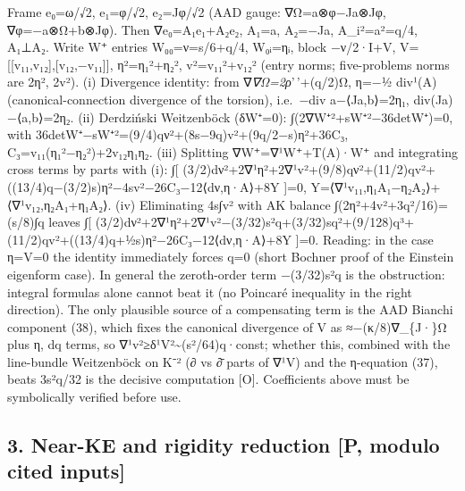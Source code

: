 \documentclass[
  10pt,
]{report}
\begin{document}
Frame e₀=ω/√2, e₁=φ/√2, e₂=Jφ/√2 (AAD gauge: ∇Ω=a⊗φ−Ja⊗Jφ,
∇φ=−a⊗Ω+b⊗Jφ). Then ∇e₀=A₁e₁+A₂e₂, A₁=a, A₂=−Ja,
\textbar A\_i\textbar²=\textbar a\textbar²=q/4, A₁⊥A₂. Write W⁺ entries
W₀₀=ν=s/6+q/4, W₀ᵢ=ηᵢ, block −ν/2·I+V,
V={[}{[}v₁₁,v₁₂{]},{[}v₁₂,−v₁₁{]}{]}, \textbar η\textbar²=η₁²+η₂²,
\textbar v\textbar²=v₁₁²+v₁₂² (entry norms; five-problems norms are
2\textbar η\textbar², 2\textbar v\textbar²). (i) Divergence identity:
from ∇\emph{∇Ω=2ρ}'\,'+(q/2)Ω, η=−½ div¹(A) (canonical-connection
divergence of the torsion), i.e.~−div a−⟨Ja,b⟩=2η₁, div(Ja)−⟨a,b⟩=2η₂.
(ii) Derdziński Weitzenböck (δW⁺=0):
∫(2\textbar∇W⁺\textbar²+s\textbar W⁺\textbar²−36detW⁺)=0, with
36detW⁺−s\textbar W⁺\textbar²=(9/4)qν²+(8\textbar s\textbar−9q)\textbar v\textbar²+(9q/2−\textbar s\textbar)\textbar η\textbar²+36C₃,
C₃=v₁₁(η₁²−η₂²)+2v₁₂η₁η₂. (iii) Splitting ∇W⁺=∇¹W⁺+T(A)·W⁺ and
integrating cross terms by parts with (i): ∫{[}
(3/2)\textbar dν\textbar²+2\textbar∇¹η\textbar²+2\textbar∇¹v\textbar²+(9/8)qν²+(11/2)q\textbar v\textbar²+((13/4)q−(3/2)\textbar s\textbar)\textbar η\textbar²−4\textbar s\textbar\textbar v\textbar²−26C₃−12⟨dν,η·A⟩+8Y
{]}=0, Y=⟨∇¹v₁₁,η₁A₁−η₂A₂⟩+⟨∇¹v₁₂,η₂A₁+η₁A₂⟩. (iv) Eliminating
4\textbar s\textbar∫\textbar v\textbar² with AK balance
∫(2\textbar η\textbar²+4\textbar v\textbar²+3q²/16)=(\textbar s\textbar/8)∫q
leaves ∫{[}
(3/2)\textbar dν\textbar²+2\textbar∇¹η\textbar²+2\textbar∇¹v\textbar²−(3/32)s²q+(3/32)\textbar s\textbar q²+(9/128)q³+(11/2)q\textbar v\textbar²+((13/4)q+½\textbar s\textbar)\textbar η\textbar²−26C₃−12⟨dν,η·A⟩+8Y
{]}=0. Reading: in the case η=V=0 the identity immediately forces q=0
(short Bochner proof of the Einstein eigenform case). In general the
zeroth-order term −(3/32)s²q is the obstruction: integral formulas alone
cannot beat it (no Poincaré inequality in the right direction). The only
plausible source of a compensating term is the AAD Bianchi component
(38), which fixes the canonical divergence of V as ≈−(κ/8)∇\_\{J·\}Ω
plus η, dq terms, so
\textbar∇¹v\textbar²≥\textbar δ¹V\textbar²\textasciitilde(s²/64)q·const;
whether this, combined with the line-bundle Weitzenböck on K⁻² (∂ vs ∂̄
parts of ∇¹V) and the η-equation (37), beats 3s²q/32 is the decisive
computation {[}O{]}. Coefficients above must be symbolically verified
before use.

\hypertarget{near-ke-and-rigidity-reduction-p-modulo-cited-inputs}{%
\subsection{3. Near-KE and rigidity reduction {[}P, modulo cited
inputs{]}}\label{near-ke-and-rigidity-reduction-p-modulo-cited-inputs}}
\end{document}
